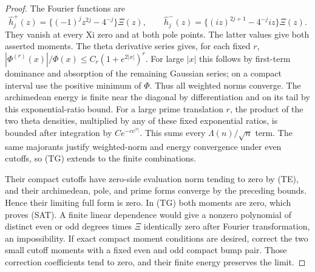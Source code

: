\documentclass[11pt]{article}
\theoremstyle{remark}\newtheorem{remark}[theorem]{Remark}
\begin{document}
\begin{proof}
The Fourier functions are
\[
 \widehat h_j^+(z)=\{(-1)^jz^{2j}-4^{-j}\}\Xi(z),\qquad
 \widehat h_j^-(z)=\{(iz)^{2j+1}-4^{-j}iz\}\Xi(z).
\]
They vanish at every Xi zero and at both pole points.
The latter values give both asserted moments.
The theta derivative series gives, for each fixed $r$,
$|\Phi^{(r)}(x)|/\Phi(x)\le C_r(1+e^{2|x|})^r$.
For large $|x|$ this follows by first-term dominance and
absorption of the remaining Gaussian series; on a compact
interval use the positive minimum of $\Phi$.
Thus all weighted norms converge.
The archimedean energy is finite near the diagonal by
differentiation and on its tail by this exponential-ratio bound.
For a large prime translation $r$, the product of the two
theta densities, multiplied by any of these fixed exponential
ratios, is bounded after integration by $C e^{-c e^{|r|}}$.
This sums every $\Lambda(n)/\sqrt n$ term.
The same majorants justify weighted-norm and energy convergence
under even cutoffs, so (TG) extends to the finite combinations.

Their compact cutoffs have zero-side evaluation norm tending
to zero by (TE), and their archimedean, pole, and prime forms
converge by the preceding bounds. Hence their limiting full
form is zero. In (TG) both moments are zero, which proves (SAT).
A finite linear dependence would give a nonzero polynomial
of distinct even or odd degrees times $\Xi$ identically zero
after Fourier transformation, an impossibility.
If exact compact moment conditions are desired, correct the
two small cutoff moments with a fixed even and odd compact
bump pair. Those correction coefficients tend to zero,
and their finite energy preserves the limit.
\end{proof}
\end{document}
